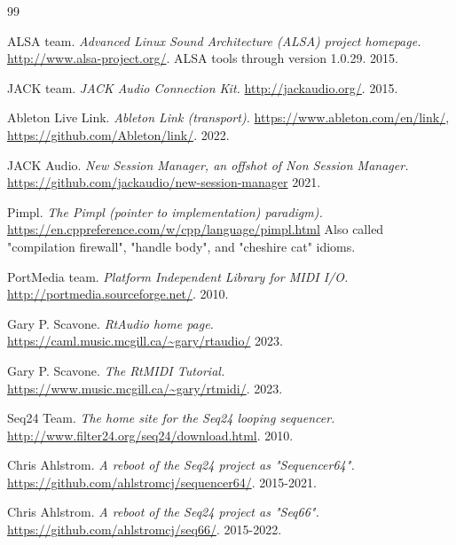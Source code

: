 {\RaggedRight
\begin{thebibliography}{99}

   ALSA team.
   \emph{Advanced Linux Sound Architecture (ALSA) project homepage.}
   \url{http://www.alsa-project.org/}.
   ALSA tools through version 1.0.29.
   2015.

   JACK team.
   \emph{JACK Audio Connection Kit.}
   \url{http://jackaudio.org/}.
   2015.

   Ableton Live Link.
   \emph{Ableton Link (transport).}
   \url{https://www.ableton.com/en/link/},
   \url{https://github.com/Ableton/link/}.
   2022.

   JACK Audio.
   \emph{New Session Manager, an offshot of Non Session Manager.}
   \url{https://github.com/jackaudio/new-session-manager}
   2021.

   Pimpl.
   \emph{The Pimpl (pointer to implementation) paradigm).}
   \url{https://en.cppreference.com/w/cpp/language/pimpl.html}
   Also called "compilation firewall", "handle body",
   and "cheshire cat" idioms.

   PortMedia team.
   \emph{Platform Independent Library for MIDI I/O.}
   \url{http://portmedia.sourceforge.net/}.
   2010.

   Gary P. Scavone.
   \emph{RtAudio home page.}
   \url{https://caml.music.mcgill.ca/~gary/rtaudio/}
   2023.

   Gary P. Scavone.
   \emph{The RtMIDI Tutorial.}
   \url{https://www.music.mcgill.ca/~gary/rtmidi/}.
   2023.

   Seq24 Team.
   \emph{The home site for the Seq24 looping sequencer.}
   \url{http://www.filter24.org/seq24/download.html}.
   2010.

   Chris Ahlstrom.
   \emph{A reboot of the Seq24 project as "Sequencer64".}
   \url{https://github.com/ahlstromcj/sequencer64/}.
   2015-2021.

   Chris Ahlstrom.
   \emph{A reboot of the Seq24 project as "Seq66".}
   \url{https://github.com/ahlstromcj/seq66/}.
   2015-2022.

\end{thebibliography}
}

